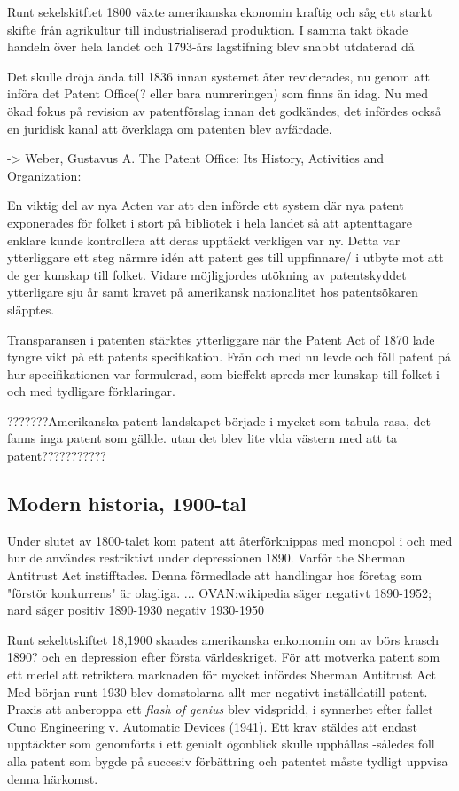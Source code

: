 Runt sekelskitftet 1800 växte amerikanska ekonomin kraftig och såg ett starkt skifte från agrikultur till
industrialiserad produktion. I samma takt ökade handeln över hela landet och 1793-års lagstifning blev
snabbt utdaterad då

 Det skulle dröja ända till 1836 innan systemet åter reviderades, nu genom att införa det Patent Office(?
eller bara numreringen) som finns än idag. Nu med ökad fokus på revision av patentförslag innan det
godkändes, det infördes också en juridisk kanal att överklaga om patenten blev avfärdade.

-> Weber, Gustavus A. The Patent Office: Its History, Activities and Organization:

En viktig del av nya Acten var att den införde ett system där nya patent exponerades för folket i stort på
bibliotek i hela landet så att aptenttagare enklare kunde kontrollera att deras upptäckt verkligen var ny\cite{watson}.
Detta var ytterliggare ett steg närmre idén att patent ges till uppfinnare/ i utbyte mot att de ger kunskap till folket.
Vidare möjligjordes utökning av patentskyddet ytterligare sju år \cite{watson} samt kravet på amerikansk nationalitet hos
patentsökaren släpptes.

Transparansen i patenten stärktes ytterliggare när the Patent Act of 1870 lade tyngre vikt på ett patents
specifikation. Från och med nu levde och föll patent på hur specifikationen var formulerad, som bieffekt
spreds mer kunskap till folket i och med tydligare förklaringar\cite{nard}.

???????Amerikanska patent landskapet började i mycket som tabula rasa, det fanns inga patent som gällde.
utan det blev lite vlda västern med att ta patent???????????


\subsection{Modern historia, 1900-tal} %

Under slutet av 1800-talet kom patent att återförknippas med monopol i och med hur de användes restriktivt
under depressionen 1890. Varför the Sherman Antitrust Act instifftades. Denna förmedlade att handlingar hos
företag som "förstör konkurrens" är olagliga. ... OVAN:wikipedia säger negativt 1890-1952; nard säger
positiv 1890-1930 negativ 1930-1950

Runt sekelttskiftet 18,1900 skaades amerikanska enkomomin om av börs krasch 1890? och en depression efter första världeskriget. För att motverka patent som ett medel att retriktera marknaden för mycket infördes Sherman Antitrust Act
Med början runt 1930 blev domstolarna allt mer negativt inställdatill patent. Praxis att anberoppa ett \emph{flash of genius} blev vidspridd, i synnerhet efter fallet Cuno
Engineering v. Automatic Devices (1941). Ett krav stäldes att endast upptäckter som genomförts i ett
genialt ögonblick skulle upphållas -således föll alla patent som bygde på succesiv förbättring och patentet
måste tydligt uppvisa denna härkomst\cite{nard}.

